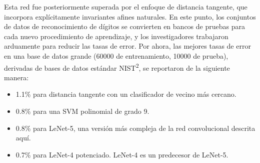 Esta red fue posteriormente superada por el enfoque de distancia tangente, que incorpora explícitamente invariantes afines naturales. En este punto, los conjuntos de datos de reconocimiento de dígitos se convierten en bancos de pruebas para cada nuevo procedimiento de aprendizaje, y los investigadores trabajaron arduamente para reducir las tasas de error. Por ahora, las mejores tasas de error en una base de datos grande (60000 de entrenamiento, 10000 de prueba), derivadas de bases de datos estándar NIST\textsuperscript{2}, se reportaron de la siguiente manera:
\begin{itemize}
\item 1.1\% para distancia tangente con un clasificador de vecino más cercano.
\item 0.8\% para una SVM polinomial de grado 9.
\item 0.8\% para LeNet-5, una versión más compleja de la red convolucional descrita aquí.
\item 0.7\% para LeNet-4 potenciado. LeNet-4 es un predecesor de LeNet-5.
\end{itemize}
